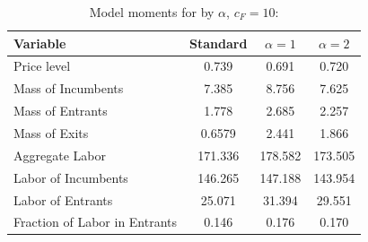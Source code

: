 \documentclass[12pt]{article}
\begin{document}
\begin{table}[htbp]
    \centering
    \caption{Model moments for by $\alpha$, $c_F = 10$:}
      \begin{tabular}{lccc}
          \toprule
            Variable                & Standard             & $\alpha = 1$           & $\alpha = 2$           \\
          \midrule
            Price level                    & 0.739        & 0.691         &     0.720      \\
            Mass of Incumbents               & 7.385       & 8.756          & 7.625                 \\
            Mass of Entrants      & 1.778        & 2.685        & 2.257       \\
            Mass of Exits      & 0.6579          & 2.441           & 1.866                \\
            Aggregate Labor   & 171.336       & 178.582          & 173.505                   \\
            Labor of Incumbents   & 146.265          & 147.188          & 143.954               \\
            Labor of Entrants  & 25.071         & 31.394          & 29.551                  \\
            Fraction of Labor in Entrants   & 0.146         & 0.176         & 0.170                  \\
          \bottomrule
      \end{tabular}
    \label{tab:cf10}
  \end{table}
\end{document}
